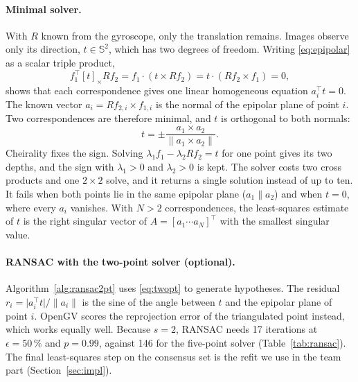 \documentclass[11pt,a4paper]{article}
\newcommand{\skewm}[1]{[#1]_{\times}}
\begin{document}
\paragraph{Minimal solver.}
With $R$ known from the gyroscope, only the translation remains. Images observe only
its direction, $t \in \mathbb{S}^2$, which has two degrees of freedom. Writing
\eqref{eq:epipolar} as a scalar triple product,
\begin{equation}
  f_1^\top \skewm{t} R f_2 = f_1 \cdot (t \times R f_2) = t \cdot (R f_2 \times f_1) = 0,
\end{equation}
shows that each correspondence gives one linear homogeneous equation $a_i^\top t = 0$.
The known vector $a_i = R f_{2,i} \times f_{1,i}$ is the normal of the epipolar plane
of point $i$. Two correspondences are therefore minimal, and $t$ is orthogonal to both
normals:
\begin{equation}
  t = \pm \frac{a_1 \times a_2}{\lVert a_1 \times a_2 \rVert} .
  \label{eq:twopt}
\end{equation}
Cheirality fixes the sign. Solving $\lambda_1 f_1 - \lambda_2 R f_2 = t$ for one point
gives its two depths, and the sign with $\lambda_1 > 0$ and $\lambda_2 > 0$ is kept.
The solver costs two cross products and one $2\times 2$ solve, and it returns a single
solution instead of up to ten. It fails when both points lie in the same epipolar
plane ($a_1 \parallel a_2$) and when $t = 0$, where every $a_i$ vanishes. With
$N > 2$ correspondences, the least-squares estimate of $t$ is the right singular
vector of $A = [a_1 \cdots a_N]^\top$ with the smallest singular value.

\paragraph{RANSAC with the two-point solver (optional).}
Algorithm~\ref{alg:ransac2pt} uses \eqref{eq:twopt} to generate hypotheses. The
residual $r_i = \lvert a_i^\top t\rvert / \lVert a_i\rVert$ is the sine of the angle
between $t$ and the epipolar plane of point $i$. OpenGV scores the reprojection error
of the triangulated point instead, which works equally well. Because $s = 2$, RANSAC
needs 17 iterations at $\epsilon = 50\,\%$ and $p = 0.99$, against 146 for the
five-point solver (Table~\ref{tab:ransac}). The final least-squares step on the
consensus set is the refit we use in the team part (Section~\ref{sec:impl}).
\end{document}
